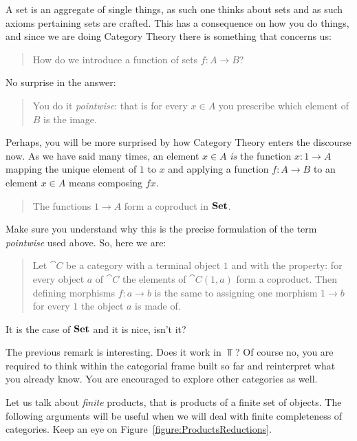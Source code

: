 \begin{example}
  A set is an aggregate of single things, as such one thinks about
  sets and as such axioms pertaining sets are crafted. This has a
  consequence on how you do things, and since we are doing Category
  Theory there is something that concerns us:
%
  \begin{quotation}
    How do we introduce a function of sets \(f : A \to B\)?
  \end{quotation}
%
  No surprise in the answer:
%
  \begin{quotation}
    You do it {\em pointwise}: that is for every \(x \in A\) you
    prescribe which element of \(B\) is the image.
  \end{quotation}
%
  Perhaps, you will be more surprised by how Category Theory enters
  the discourse now. As we have said many times, an element
  \(x \in A\) {\em is} the function \(x : 1 \to A\) mapping the unique
  element of \(1\) to \(x\) and applying a function \(f : A \to B\) to
  an element \(x \in A\) means composing \(f x\).
  \begin{quotation}
    The functions \(1 \to A\) form a coproduct in
    \(\mathbf{Set}\). %
  \end{quotation}
%
  Make sure you understand why this is the precise formulation of the
  term {\em pointwise} used above. So, here we are:
%
  \begin{quotation}
    Let \(\cat C\) be a category with a terminal object \(1\) and with
    the property: for every object \(a\) of \(\cat C\) the elements of
    \(\cat C (1, a)\) form a coproduct. Then defining morphisms
    \(f : a \to b\) is the same to assigning one morphism \(1 \to b\) for
    every \(1\) the object \(a\) is made of.
  \end{quotation}
  It is the case of \(\mathbf{Set}\) and it is nice, isn't it?
\end{example}

\begin{exercise}
  The previous remark is interesting. Does it work in \(\Top\)? Of
  course no, you are required to think within the categorial frame
  built so far and reinterpret what you already know. You are
  encouraged to explore other categories as well.
\end{exercise}

Let us talk about {\em finite} products, that is products of a finite
set of objects. The following arguments will be useful when we will
deal with finite completeness of categories. Keep an eye on
Figure~\ref{figure:ProductsReductions}.

